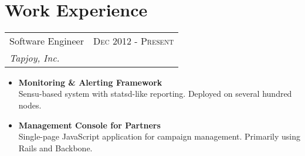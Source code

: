 \documentclass[10pt]{article} %
\begin{document}
\color{text1} %


\par{\\


\begin{minipage}[t]{0.5\textwidth}
\vspace{0pt} %


\section{Work Experience}


\begin{tabularx}{\linewidth}{ X r }
  {\large Software Engineer } & {\textsc{Dec 2012 - Present}} \\
  {\small\textit{Tapjoy, Inc.}}
\end{tabularx}

\begin{itemize}
  \item \textbf{Monitoring \& Alerting Framework} \\
    Sensu-based system with statsd-like reporting. Deployed on several hundred nodes.
  \item \textbf{Management Console for Partners} \\
    Single-page JavaScript application for campaign management. Primarily using Rails and Backbone.
\end{itemize}



\end{minipage}}
\end{document}
